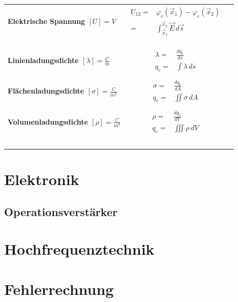 \documentclass[a4paper]{article}
\begin{document}
\begin{table}[h]
{\begin{tabular}{@{}>{\bfseries}lcc@{}}
\makecell[l]{Elektrische Spannung \\ $[U] = V$}
	& $\begin{aligned}
		U_{12} = & \varphi_e(\vec{x}_1) - \varphi_e(\vec{x}_2) \\
		= & \int_{\vec{x}_1}^{\vec{x}_2} \vec{E}\, d\vec{s}
	\end{aligned}$
	& \\ \\
	 
\midrule \\ \\
	
\makecell[l]{Linienladungsdichte \\ $[\lambda] = \frac{C}{m}$}
	& $\begin{aligned}
		\lambda = & \frac{dq_e}{ds} \\
		q_e = & \int \lambda\,ds
	\end{aligned}$ \\ \\
	
\makecell[l]{Flächenladungsdichte \\ $[\sigma] = \frac{C}{m^2}$}
	& $\begin{aligned}
		\sigma = & \frac{dq_e}{dA} \\
		q_e = & \iint \sigma\,dA
	\end{aligned}$ \\ \\
	
\makecell[l]{Volumenladungsdichte \\ $[\rho] = \frac{C}{m^3}$}
	& $\begin{aligned}
		\rho = & \frac{dq_e}{dV} \\
		q_e = & \iiint \rho\,dV
	\end{aligned}$ \\ \\

\bottomrule

\label{tab:Elektrostatik}
\end{tabular}
}
\end{table}

\newpage
\section{Elektronik}

\subsection{Operationsverstärker}

\section{Hochfrequenztechnik}

\section{Fehlerrechnung}

\newpage
\printbibliography
\end{document}

